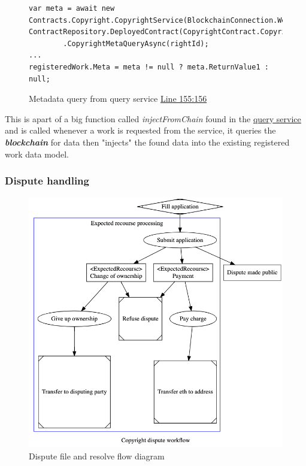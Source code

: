 \documentclass[12pt]{article}
\newcommand{\keyword}[1]{\textbf{\textit{#1}}}
\begin{document}
\begin{figure}[H]
\caption{Metadata query from query service \href{https://github.com/MrHarrisonBarker/CRPL/blob/main/CRPL.Web/Services/QueryService.cs}{Line 155:156}}
\centering
\begin{lstlisting}[language=CSharp]
var meta = await new Contracts.Copyright.CopyrightService(BlockchainConnection.Web3(), ContractRepository.DeployedContract(CopyrightContract.Copyright).Address)
		.CopyrightMetaQueryAsync(rightId);
...
registeredWork.Meta = meta != null ? meta.ReturnValue1 : null;
\end{lstlisting}
\end{figure}

This is apart of a big function called \textit{injectFromChain} found in the \href{https://github.com/MrHarrisonBarker/CRPL/blob/main/CRPL.Web/Services/QueryService.cs}{query service} and is called whenever a work is requested from the service, it queries the \keyword{blockchain} for data then "injects" the found data into the existing registered work data model.

\subsubsection{Dispute handling}
\begin{figure}[H]
\caption{Dispute file and resolve flow diagram}
\centering
\includegraphics[width=\textwidth,height=\textheight,keepaspectratio]{images/operational/dispute-workflow}
\end{figure}
\end{document}
